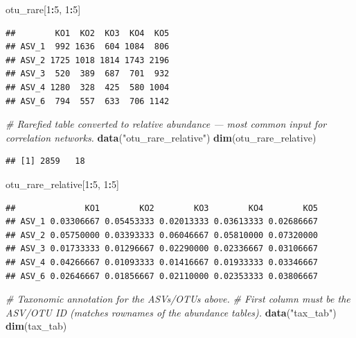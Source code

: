 \documentclass[
]{book}
\newenvironment{Shaded}{\begin{snugshade}}{\end{snugshade}}
\newcommand{\CommentTok}[1]{\textcolor[rgb]{0.56,0.35,0.01}{\textit{#1}}}
\newcommand{\DecValTok}[1]{\textcolor[rgb]{0.00,0.00,0.81}{#1}}
\newcommand{\FunctionTok}[1]{\textcolor[rgb]{0.13,0.29,0.53}{\textbf{#1}}}
\newcommand{\NormalTok}[1]{#1}
\newcommand{\SpecialCharTok}[1]{\textcolor[rgb]{0.81,0.36,0.00}{\textbf{#1}}}
\newcommand{\StringTok}[1]{\textcolor[rgb]{0.31,0.60,0.02}{#1}}
\begin{document}
\begin{Shaded}
\begin{Highlighting}[]
\NormalTok{otu\_rare[}\DecValTok{1}\SpecialCharTok{:}\DecValTok{5}\NormalTok{, }\DecValTok{1}\SpecialCharTok{:}\DecValTok{5}\NormalTok{]}
\end{Highlighting}
\end{Shaded}

\begin{verbatim}
##        KO1  KO2  KO3  KO4  KO5
## ASV_1  992 1636  604 1084  806
## ASV_2 1725 1018 1814 1743 2196
## ASV_3  520  389  687  701  932
## ASV_4 1280  328  425  580 1004
## ASV_6  794  557  633  706 1142
\end{verbatim}

\begin{Shaded}
\begin{Highlighting}[]
\CommentTok{\# Rarefied table converted to relative abundance — most common input for correlation networks.}
\FunctionTok{data}\NormalTok{(}\StringTok{"otu\_rare\_relative"}\NormalTok{)}
\FunctionTok{dim}\NormalTok{(otu\_rare\_relative)}
\end{Highlighting}
\end{Shaded}

\begin{verbatim}
## [1] 2859   18
\end{verbatim}

\begin{Shaded}
\begin{Highlighting}[]
\NormalTok{otu\_rare\_relative[}\DecValTok{1}\SpecialCharTok{:}\DecValTok{5}\NormalTok{, }\DecValTok{1}\SpecialCharTok{:}\DecValTok{5}\NormalTok{]}
\end{Highlighting}
\end{Shaded}

\begin{verbatim}
##              KO1        KO2        KO3        KO4        KO5
## ASV_1 0.03306667 0.05453333 0.02013333 0.03613333 0.02686667
## ASV_2 0.05750000 0.03393333 0.06046667 0.05810000 0.07320000
## ASV_3 0.01733333 0.01296667 0.02290000 0.02336667 0.03106667
## ASV_4 0.04266667 0.01093333 0.01416667 0.01933333 0.03346667
## ASV_6 0.02646667 0.01856667 0.02110000 0.02353333 0.03806667
\end{verbatim}

\begin{Shaded}
\begin{Highlighting}[]
\CommentTok{\# Taxonomic annotation for the ASVs/OTUs above.}
\CommentTok{\# First column must be the ASV/OTU ID (matches rownames of the abundance tables).}
\FunctionTok{data}\NormalTok{(}\StringTok{"tax\_tab"}\NormalTok{)}
\FunctionTok{dim}\NormalTok{(tax\_tab)}
\end{Highlighting}
\end{Shaded}
\end{document}
